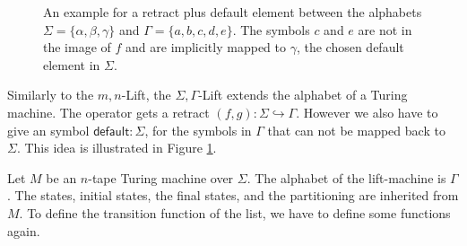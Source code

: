 \documentclass{psartcl}
\newcommand{\MS}[1]{\textsf{#1}}
\newcommand{\setOf}[1]{\bigl \{ #1 \bigr \}}
\newcommand{\from}{:}
\newcommand{\Tau}{\Gamma}
\begin{document}
\begin{figure}
  \center
  \caption{An example for a retract plus default element between the alphabets $\Sigma = \setOf{\alpha, \beta, \gamma}$ and $\Tau =
    \setOf{a,b,c,d,e}$.  The symbols $c$ and $e$ are not in the image of $f$ and are implicitly mapped to $\gamma$, the chosen default element in
  $\Sigma$.}
\label{fig:sigma-tau-lift-example-mapping}
\end{figure}

Similarly to the $m,n$-Lift, the $\Sigma,\Tau$-Lift extends the alphabet of a Turing machine.  The operator gets a retract $(f,g) \from \Sigma
\hookrightarrow \Tau$.  However we also have to give an symbol $\MS{default}:\Sigma$, for the symbols in $\Tau$ that can not be mapped back to
$\Sigma$.  This idea is illustrated in Figure \ref{fig:sigma-tau-lift-example-mapping}.

Let $M$ be an $n$-tape Turing machine over $\Sigma$.  The alphabet of the lift-machine is $\Tau$.  The states, initial states, the final states, and
the partitioning are inherited from $M$.  To define the transition function of the list, we have to define some functions again.
\end{document}
